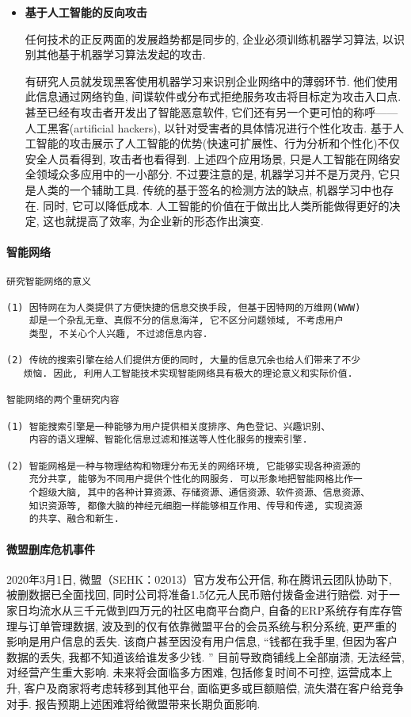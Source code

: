 \begin{itemize}
\item \textbf{基于人工智能的反向攻击}

任何技术的正反两面的发展趋势都是同步的, 企业必须训练机器学习算法, 以识别其他基于机器学习算法发起的攻击.
\begin{example}
有研究人员就发现黑客使用机器学习来识别企业网络中的薄弱环节. 他们使用此信息通过网络钓鱼, 间谍软件或分布式拒绝服务攻击将目标定为攻击入口点.
甚至已经有攻击者开发出了智能恶意软件, 它们还有另一个更可怕的称呼——人工黑客(artificial hackers), 以针对受害者的具体情况进行个性化攻击. 基于人工智能的攻击展示了人工智能的优势(快速可扩展性、行为分析和个性化)不仅安全人员看得到, 攻击者也看得到.
上述四个应用场景, 只是人工智能在网络安全领域众多应用中的一小部分. 不过要注意的是, 机器学习并不是万灵丹, 它只是人类的一个辅助工具. 传统的基于签名的检测方法的缺点, 机器学习中也存在.
同时, 它可以降低成本. 人工智能的价值在于做出比人类所能做得更好的决定, 这也就提高了效率, 为企业新的形态作出演变.
\end{example}
\end{itemize}
\paragraph{智能网络}
\begin{Verbatim}
研究智能网络的意义

(1) 因特网在为人类提供了方便快捷的信息交换手段, 但基于因特网的万维网(WWW)
    却是一个杂乱无章、真假不分的信息海洋, 它不区分问题领域, 不考虑用户
    类型, 不关心个人兴趣, 不过滤信息内容.

(2) 传统的搜索引擎在给人们提供方便的同时, 大量的信息冗余也给人们带来了不少
   烦恼. 因此, 利用人工智能技术实现智能网络具有极大的理论意义和实际价值.

智能网络的两个重研究内容

(1) 智能搜索引擎是一种能够为用户提供相关度排序、角色登记、兴趣识别、
    内容的语义理解、智能化信息过滤和推送等人性化服务的搜索引擎.

(2) 智能网格是一种与物理结构和物理分布无关的网络环境, 它能够实现各种资源的
    充分共享, 能够为不同用户提供个性化的网服务. 可以形象地把智能网格比作一
    个超级大脑, 其中的各种计算资源、存储资源、通信资源、软件资源、信息资源、
    知识资源等, 都像大脑的神经元细胞一样能够相互作用、传导和传递, 实现资源
    的共享、融合和新生.
\end{Verbatim}
\paragraph{微盟删库危机事件}
2020年3月1日, 微盟（SEHK：02013）官方发布公开信, 称在腾讯云团队协助下, 被删数据已全面找回, 同时公司将准备1.5亿元人民币赔付拨备金进行赔偿.
对于一家日均流水从三千元做到四万元的社区电商平台商户, 自备的ERP系统存有库存管理与订单管理数据, 波及到的仅有依靠微盟平台的会员系统与积分系统, 更严重的影响是用户信息的丢失.
该商户甚至因没有用户信息, “钱都在我手里, 但因为客户数据的丢失, 我都不知道该给谁发多少钱. ”
目前导致商铺线上全部崩溃, 无法经营, 对经营产生重大影响.
未来将会面临多方困难, 包括修复时间不可控, 运营成本上升, 客户及商家将考虑转移到其他平台, 面临更多或巨额赔偿, 流失潜在客户给竞争对手. 报告预期上述困难将给微盟带来长期负面影响.
